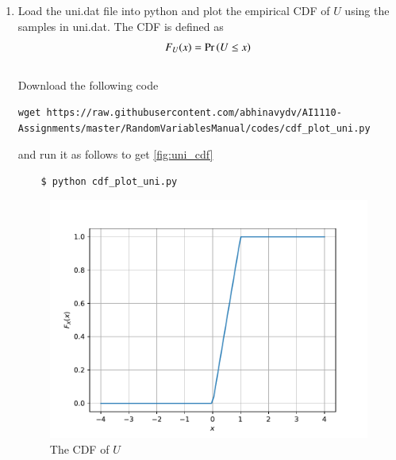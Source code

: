 \documentclass[journal,12pt,twocolumn]{IEEEtran}
\renewcommand\thesection{\arabic{section}}
\begin{document}
\begin{enumerate}[label=\thesection.\arabic*
        ,ref=\thesection.\theenumi]
    \item
          Load the uni.dat file into python and plot the empirical CDF of $U$ using the samples in uni.dat. The CDF is defined as
          \begin{align}
              F_{U}(x) = \Pr\left(U \le x\right)
          \end{align}
          \\
          \solution  Download the following code
          \begin{lstlisting}
wget https://raw.githubusercontent.com/abhinavydv/AI1110-Assignments/master/RandomVariablesManual/codes/cdf_plot_uni.py
\end{lstlisting}
          and run it as follows to get \autoref{fig:uni_cdf}
          \begin{lstlisting}
    $ python cdf_plot_uni.py
\end{lstlisting}
          \begin{figure}
              \centering
              \includegraphics[width=\columnwidth]{./figs/uni_cdf}
              \caption{The CDF of $U$}
              \label{fig:uni_cdf}
          \end{figure}


\end{enumerate}
\end{document}
